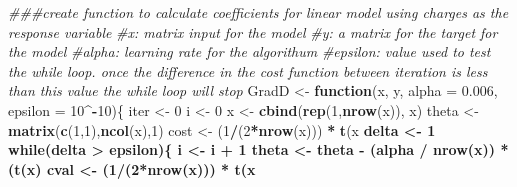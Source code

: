 \documentclass[
]{article}
\newenvironment{Shaded}{\begin{snugshade}}{\end{snugshade}}
\newcommand{\CommentTok}[1]{\textcolor[rgb]{0.56,0.35,0.01}{\textit{#1}}}
\newcommand{\ControlFlowTok}[1]{\textcolor[rgb]{0.13,0.29,0.53}{\textbf{#1}}}
\newcommand{\DataTypeTok}[1]{\textcolor[rgb]{0.13,0.29,0.53}{#1}}
\newcommand{\DecValTok}[1]{\textcolor[rgb]{0.00,0.00,0.81}{#1}}
\newcommand{\FloatTok}[1]{\textcolor[rgb]{0.00,0.00,0.81}{#1}}
\newcommand{\KeywordTok}[1]{\textcolor[rgb]{0.13,0.29,0.53}{\textbf{#1}}}
\newcommand{\NormalTok}[1]{#1}
\newcommand{\OperatorTok}[1]{\textcolor[rgb]{0.81,0.36,0.00}{\textbf{#1}}}
\newcommand{\StringTok}[1]{\textcolor[rgb]{0.31,0.60,0.02}{#1}}
\begin{document}
\begin{Shaded}
\begin{Highlighting}[]
\CommentTok{###create function to calculate coefficients for linear model using charges as the response variable}
\CommentTok{#x: matrix input for the model}
\CommentTok{#y: a matrix for the target for the model}
\CommentTok{#alpha: learning rate for the algorithum}
\CommentTok{#epsilon: value used to test the while loop. once the difference in the cost function between iteration is less than this value the while loop will stop }
\NormalTok{GradD <-}\StringTok{ }\ControlFlowTok{function}\NormalTok{(x, y, }\DataTypeTok{alpha =} \FloatTok{0.006}\NormalTok{, }\DataTypeTok{epsilon =} \DecValTok{10}\OperatorTok{^-}\DecValTok{10}\NormalTok{)\{}
\NormalTok{  iter <-}\StringTok{ }\DecValTok{0}
\NormalTok{  i <-}\StringTok{ }\DecValTok{0}
\NormalTok{  x <-}\StringTok{ }\KeywordTok{cbind}\NormalTok{(}\KeywordTok{rep}\NormalTok{(}\DecValTok{1}\NormalTok{,}\KeywordTok{nrow}\NormalTok{(x)), x)}
\NormalTok{  theta <-}\StringTok{ }\KeywordTok{matrix}\NormalTok{(}\KeywordTok{c}\NormalTok{(}\DecValTok{1}\NormalTok{,}\DecValTok{1}\NormalTok{),}\KeywordTok{ncol}\NormalTok{(x),}\DecValTok{1}\NormalTok{)}
\NormalTok{  cost <-}\StringTok{ }\NormalTok{(}\DecValTok{1}\OperatorTok{/}\NormalTok{(}\DecValTok{2}\OperatorTok{*}\KeywordTok{nrow}\NormalTok{(x))) }\OperatorTok{*}\StringTok{ }\KeywordTok{t}\NormalTok{(x }\OperatorTok{%
\NormalTok{  delta <-}\StringTok{ }\DecValTok{1}
  \ControlFlowTok{while}\NormalTok{(delta }\OperatorTok{>}\StringTok{ }\NormalTok{epsilon)\{}
\NormalTok{    i <-}\StringTok{ }\NormalTok{i }\OperatorTok{+}\StringTok{ }\DecValTok{1}
\NormalTok{    theta <-}\StringTok{ }\NormalTok{theta }\OperatorTok{-}\StringTok{ }\NormalTok{(alpha }\OperatorTok{/}\StringTok{ }\KeywordTok{nrow}\NormalTok{(x)) }\OperatorTok{*}\StringTok{ }\NormalTok{(}\KeywordTok{t}\NormalTok{(x) }\OperatorTok{%
\NormalTok{    cval <-}\StringTok{ }\NormalTok{(}\DecValTok{1}\OperatorTok{/}\NormalTok{(}\DecValTok{2}\OperatorTok{*}\KeywordTok{nrow}\NormalTok{(x))) }\OperatorTok{*}\StringTok{ }\KeywordTok{t}\NormalTok{(x }\OperatorTok{%
}}}
\end{Highlighting}
\end{Shaded}
\end{document}
